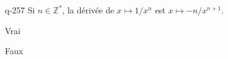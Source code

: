 \begin{truefalse}{q-257}
Si $n \in \mathbb Z^*$, la dérivée de $x\mapsto 1/x^n$ est $x\mapsto -n/x^{n+1}$.
\item* Vrai
\item Faux
\end{truefalse}

